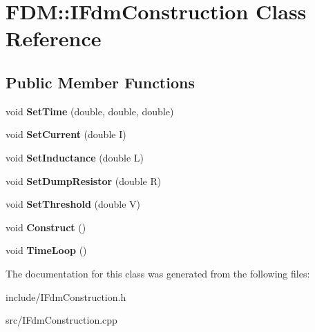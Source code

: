 \hypertarget{class_f_d_m_1_1_i_fdm_construction}{}\section{F\+D\+M\+:\+:I\+Fdm\+Construction Class Reference}
\label{class_f_d_m_1_1_i_fdm_construction}
\subsection*{Public Member Functions}
\begin{DoxyCompactItemize}
\item 
\hypertarget{class_f_d_m_1_1_i_fdm_construction_a474da9d292896fad95c37a7584bb5e40}{}void {\bfseries Set\+Time} (double, double, double)\label{class_f_d_m_1_1_i_fdm_construction_a474da9d292896fad95c37a7584bb5e40}

\item 
\hypertarget{class_f_d_m_1_1_i_fdm_construction_a24f493dcf9aba34817b18de4522e11d2}{}void {\bfseries Set\+Current} (double I)\label{class_f_d_m_1_1_i_fdm_construction_a24f493dcf9aba34817b18de4522e11d2}

\item 
\hypertarget{class_f_d_m_1_1_i_fdm_construction_a4ec794a70ec4606a9c27c7b44c513218}{}void {\bfseries Set\+Inductance} (double L)\label{class_f_d_m_1_1_i_fdm_construction_a4ec794a70ec4606a9c27c7b44c513218}

\item 
\hypertarget{class_f_d_m_1_1_i_fdm_construction_a3f0b151320939a5cfb909614a4e815a1}{}void {\bfseries Set\+Dump\+Resistor} (double R)\label{class_f_d_m_1_1_i_fdm_construction_a3f0b151320939a5cfb909614a4e815a1}

\item 
\hypertarget{class_f_d_m_1_1_i_fdm_construction_a42fa7b5333d9cbe3968e83c05645a7d6}{}void {\bfseries Set\+Threshold} (double V)\label{class_f_d_m_1_1_i_fdm_construction_a42fa7b5333d9cbe3968e83c05645a7d6}

\item 
\hypertarget{class_f_d_m_1_1_i_fdm_construction_a0312d5504321fedd7fc1c97cd10413c8}{}void {\bfseries Construct} ()\label{class_f_d_m_1_1_i_fdm_construction_a0312d5504321fedd7fc1c97cd10413c8}

\item 
\hypertarget{class_f_d_m_1_1_i_fdm_construction_ae8233944c6ca91793eb93ef5488fbfcc}{}void {\bfseries Time\+Loop} ()\label{class_f_d_m_1_1_i_fdm_construction_ae8233944c6ca91793eb93ef5488fbfcc}

\end{DoxyCompactItemize}


The documentation for this class was generated from the following files\+:\begin{DoxyCompactItemize}
\item 
include/I\+Fdm\+Construction.\+h\item 
src/I\+Fdm\+Construction.\+cpp\end{DoxyCompactItemize}
